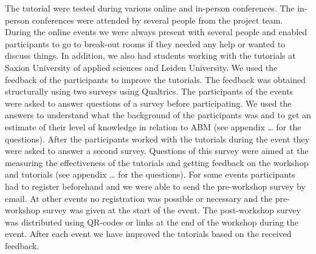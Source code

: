 \documentclass[
]{article}
\begin{document}
The tutorial were tested during various online and in-person conferences. The in-person conferences were attended by several people from the project team. During the online events we were always present with several people and enabled participants to go to break-out rooms if they needed any help or wanted to discuss things. In addition, we also had students working with the tutorials at Saxion University of applied sciences and Leiden University. We used the feedback of the participants to improve the tutorials. The feedback was obtained structurally using two surveys using Qualtrics. The participants of the events were asked to answer questions of a survey before participating. We used the answers to understand what the background of the participants was and to get an estimate of their level of knowledge in relation to ABM (see appendix \ldots{} for the questions). After the participants worked with the tutorials during the event they were asked to answer a second survey. Questions of this survey were aimed at the measuring the effectiveness of the tutorials and getting feedback on the workshop and tutorials (see appendix \ldots{} for the questions). For some events participants had to register beforehand and we were able to send the pre-workshop survey by email. At other events no registration was possible or necessary and the pre-workshop survey was given at the start of the event. The post-workshop survey was distributed using QR-codes or links at the end of the workshop during the event. After each event we have improved the tutorials based on the received feedback.
\end{document}
